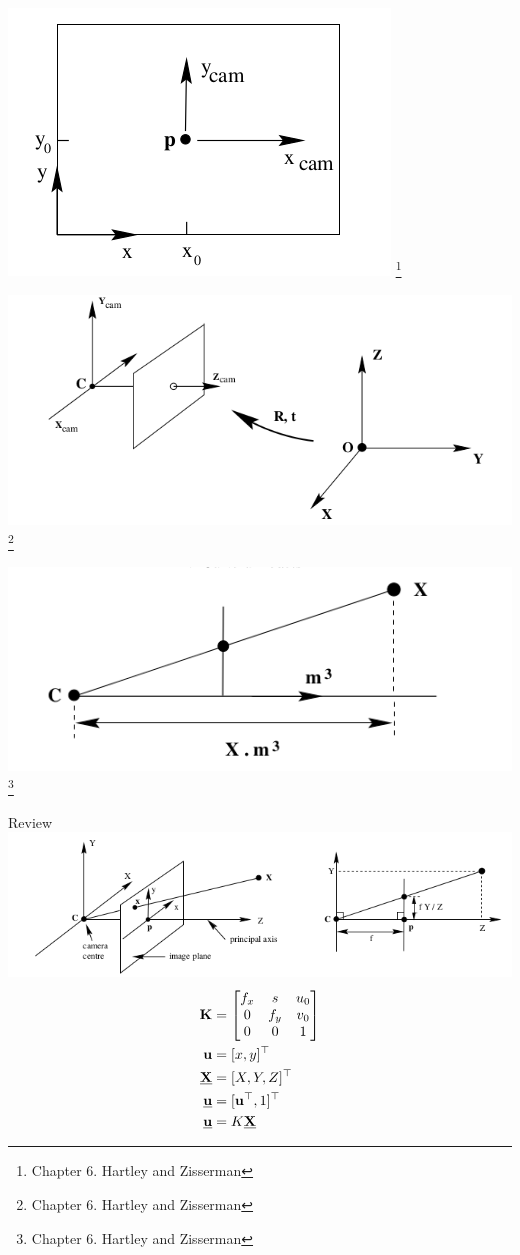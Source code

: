 \documentclass{beamer}
\begin{document}
  \begin{frame}
    \includegraphics[width=0.4\linewidth]{media/image-center.png}
    \footnote{Chapter 6. Hartley and Zisserman}
  \end{frame}

  \begin{frame}
    \includegraphics[width=0.4\linewidth]{media/world-camera-transformation.png}
    \footnote{Chapter 6. Hartley and Zisserman}
  \end{frame}

  \begin{frame}
    \includegraphics[width=0.4\linewidth]{media/recovering-ray-from-point.png}
    \footnote{Chapter 6. Hartley and Zisserman}
  \end{frame}

  \begin{frame}{Review}
    \includegraphics[width=\linewidth]{media/pinhole-camera-model-2.png}
    \newcommand{\ubfu}{\underline{\bfu}}
    \newcommand{\ubfX}{\underline{\bfX}}
    \begin{align}
      \bfK &= \begin{bmatrix}
        f_x & s & u_0 \\
        0 & f_y & v_0 \\
        0 & 0 & 1 \\
      \end{bmatrix}
      \\
      \bfu &= [x, y]^\top \\
      \ubfX &= [X, Y, Z]^\top\\
      \ubfu &= [\bfu^\top, 1]^\top \\
      \ubfu &= K \ubfX
      \end{align}
    \end{frame}
\end{document}
